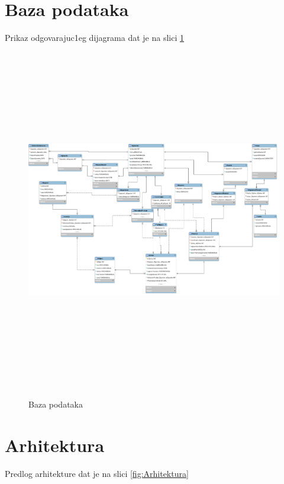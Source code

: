 \documentclass[10 pt]{article}
\begin{document}
	
	\section{Baza podataka}
		
		Prikaz odgovarajuc1eg dijagrama dat je na slici \ref{fig:BazaPodataka}
		
		\begin{figure}[H]
			\centering
			\includegraphics[width=15cm,height=15cm,keepaspectratio]{slike/baza.png}\\
			\caption{Baza podataka}
			\label{fig:BazaPodataka}
		\end{figure}

	
	\section{Arhitektura}
	
		Predlog arhitekture dat je na slici \ref{fig:Arhitektura}
		
\end{document}
